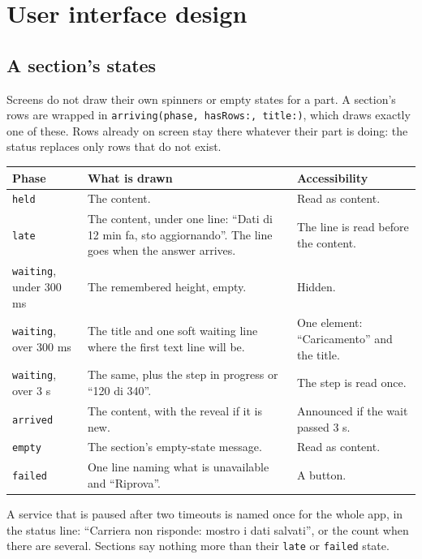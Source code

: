\section{User interface design}

\subsection{A section's states}
Screens do not draw their own spinners or empty states for a part. A section's rows
are wrapped in \texttt{arriving(phase, hasRows:, title:)}, which draws exactly one of
these. Rows already on screen stay there whatever their part is doing: the status
replaces only rows that do not exist.

\begin{center}\small
\begin{tabularx}{\linewidth}{@{}l X X@{}}
  \toprule
  Phase & What is drawn & Accessibility \\
  \midrule
  \texttt{held} & The content. & Read as content. \\
  \texttt{late} & The content, under one line: ``Dati di 12 min fa, sto aggiornando''. The line goes when the answer arrives. & The line is read before the content. \\
  \texttt{waiting}, under 300 ms & The remembered height, empty. & Hidden. \\
  \texttt{waiting}, over 300 ms & The title and one soft waiting line where the first text line will be. & One element: ``Caricamento'' and the title. \\
  \texttt{waiting}, over 3 s & The same, plus the step in progress or ``120 di 340''. & The step is read once. \\
  \texttt{arrived} & The content, with the reveal if it is new. & Announced if the wait passed 3 s. \\
  \texttt{empty} & The section's empty-state message. & Read as content. \\
  \texttt{failed} & One line naming what is unavailable and ``Riprova''. & A button. \\
  \bottomrule
\end{tabularx}
\end{center}

A service that is paused after two timeouts is named once for the whole app, in
the status line: ``Carriera non risponde: mostro i dati salvati'', or the count
when there are several. Sections say nothing more than their \texttt{late} or
\texttt{failed} state.

